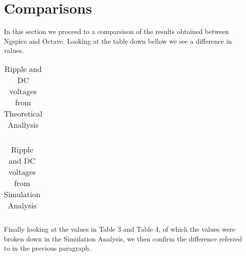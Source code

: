 \section{Comparisons}
\label{sec:comparsisons}

In this section we proceed to a comparsison of the results obtained between Ngspice and Octave. Looking at the table down bellow we see a difference in values. %

\FloatBarrier
\begin{table}[h]
  \centering
  \begin{tabular}{|c|c|c|c|c|c|c|}
    \hline    
    
    \hline
  \end{tabular}
  \caption{Ripple and DC voltages from Theoretical Anallysis}
  \label{tab:Octave}
\end{table}
\FloatBarrier 

\FloatBarrier
\begin{table}[h]
  \centering
  \begin{tabular}{|c|c|c|}
    \hline    
    
    \hline
  \end{tabular}
  \caption{Ripple and DC voltages from Simulation Analysis}
  \label{tab:Octave}
\end{table}
\FloatBarrier 

Finally looking at the values in Table 3 and Table 4, of which the values were broken down in the Simulation Analysis, we then confirm the difference referred to in the previous paragraph.




